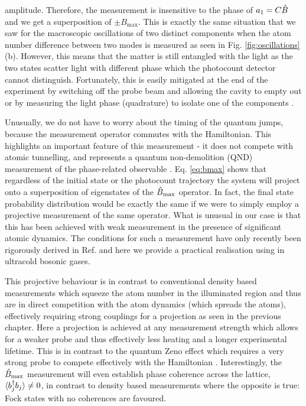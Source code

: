 amplitude. Therefore, the measurement is insensitive to the phase of
$a_1 = C \hat{B}$ and we get a superposition of $\pm B_\mathrm{max}$. This
is exactly the same situation that we saw for the macroscopic
oscillations of two distinct components when the atom number
difference between two modes is measured as seen in
Fig. \ref{fig:oscillations}(b). However, this means that the matter is
still entangled with the light as the two states scatter light with
different phase which the photocount detector cannot
distinguish. Fortunately, this is easily mitigated at the end of the
experiment by switching off the probe beam and allowing the cavity to
empty out or by measuring the light phase (quadrature) to isolate one
of the components \cite{mekhov2012, mekhov2009pra, atoms2015}.

Unusually, we do not have to worry about the timing of the quantum
jumps, because the measurement operator commutes with the
Hamiltonian. This highlights an important feature of this measurement
- it does not compete with atomic tunnelling, and represents a quantum
non-demolition (QND) measurement of the phase-related observable
\cite{brune1992}. Eq. \eqref{eq:bmax} shows that regardless of the
initial state or the photocount trajectory the system will project
onto a superposition of eigenstates of the $\hat{B}_\mathrm{max}$ operator. In fact,
the final state probability distribution would be exactly the same if
we were to simply employ a projective measurement of the same
operator. What is unusual in our case is that this has been achieved
with weak measurement in the presence of significant atomic
dynamics. The conditions for such a measurement have only recently
been rigorously derived in Ref. \cite{weinberg2016} and here we
provide a practical realisation using in ultracold bosonic gases.

This projective behaviour is in contrast to conventional density based
measurements which squeeze the atom number in the illuminated region
and thus are in direct competition with the atom dynamics (which
spreads the atoms), effectively requiring strong couplings for a
projection as seen in the previous chapter. Here a projection is
achieved at any measurement strength which allows for a weaker probe
and thus effectively less heating and a longer experimental
lifetime. This is in contrast to the quantum Zeno effect which
requires a very strong probe to compete effectively with the
Hamiltonian \cite{misra1977, facchi2008, raimond2010, raimond2012,
  signoles2014}. Interestingly, the $\hat{B}_\mathrm{max}$ measurement will even
establish phase coherence across the lattice, $\langle b^\dagger_j b_j
\rangle \ne 0$, in contrast to density based measurements where the
opposite is true: Fock states with no coherences are favoured.

